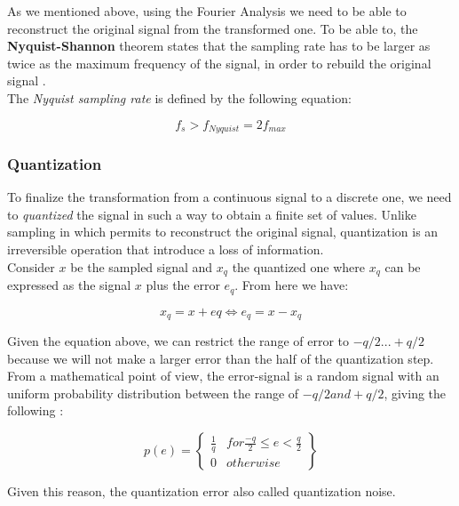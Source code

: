 \noindent As we mentioned above, using the Fourier Analysis we need to be able to reconstruct the original signal from the transformed one. To be able to, the \textbf{Nyquist-Shannon} theorem states that the sampling rate has to be larger as twice as the maximum frequency of the signal, in order to rebuild the original signal \cite{sampling_illinois}.\\
\noindent The \textit{Nyquist sampling rate} is defined by the following equation:

\begin{equation}
f_{s} > f_{Nyquist} = 2f_{max}
\end{equation}


\subsubsection{Quantization}
\label{subs:quantization}
To finalize the transformation from a continuous signal to a discrete one, we need to \textit{quantized} the signal in such a way to obtain a finite set of values. Unlike sampling in which permits to reconstruct the original signal, quantization is an irreversible operation that introduce a loss of information. \\
\noindent Consider $x$ be the sampled signal and $x_{q}$ the quantized one where $x_{q}$ can be expressed as the signal $x$ plus the error $e_{q}$. From here we have:

\begin{equation}
x_{q} = x + e{q} \Leftrightarrow e_{q} = x - x_{q}
\end{equation}

Given the equation above, we can restrict the range of error to $-q/2 ... +q/2$ because we will not make a larger error than the half of the quantization step. From a mathematical point of view, the error-signal is a random signal with an uniform probability distribution between the range of $−q/2 and +q/2$, giving the following \cite{quantization_math}:

\begin{equation}
p(e) = \begin{Bmatrix}
			\frac{1}{q} & for \frac{-q}{2} \leq  e < \frac{q}{2}\\ 
			0 			& otherwise
		\end{Bmatrix}
\end{equation}

Given this reason, the quantization error also called quantization noise.

